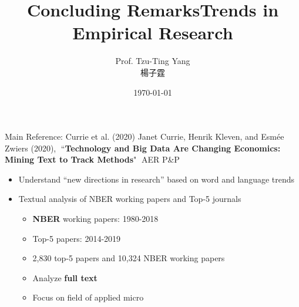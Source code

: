 \documentclass[dvipsnames,hyperref={pdfpagelabels=false}]{beamer}
\title[]  
{Concluding Remarks}
\author 
{Prof. Tzu-Ting Yang  \\ 楊子霆}
\institute{Institute of Economics, Academia Sinica  \\ 中央研究院經濟研究所}
\date
{\today}
\begin{document}
	
	
	\begin{frame}{}
	\titlepage
\end{frame}








\title[]  
{Trends in Empirical Research}


\author 
{}

\institute{}






\date
{}


\begin{frame}{}
	\titlepage
\end{frame}





\begin{frame}{Main Reference: Currie et al. (2020)}
	Janet Currie, Henrik Kleven, and Esmée Zwiers (2020), ``\textbf{Technology and Big Data Are Changing Economics: Mining Text to Track Methods}" AER P\&P
	\vspace{0.2cm}	
	\begin{itemize}
		\item Understand ``new directions in research'' based on word and language trends
		\vspace{0.2cm}	
		\item  Textual analysis of NBER working papers and Top-5 journals
		\vspace{0.2cm}	
		\begin{itemize}
			\item \textbf{NBER} working papers: 1980-2018
			\vspace{0.2cm}	
			\item Top-5 papers: 2014-2019
			\vspace{0.2cm}
			\item 2,830 top-5 papers and 10,324 NBER working papers	
			\vspace{0.2cm}		
			\item Analyze \textbf{full text}
			\vspace{0.2cm}	
			\item Focus on field of applied micro	
		\end{itemize}
	\end{itemize}
\end{frame}
\end{document}
